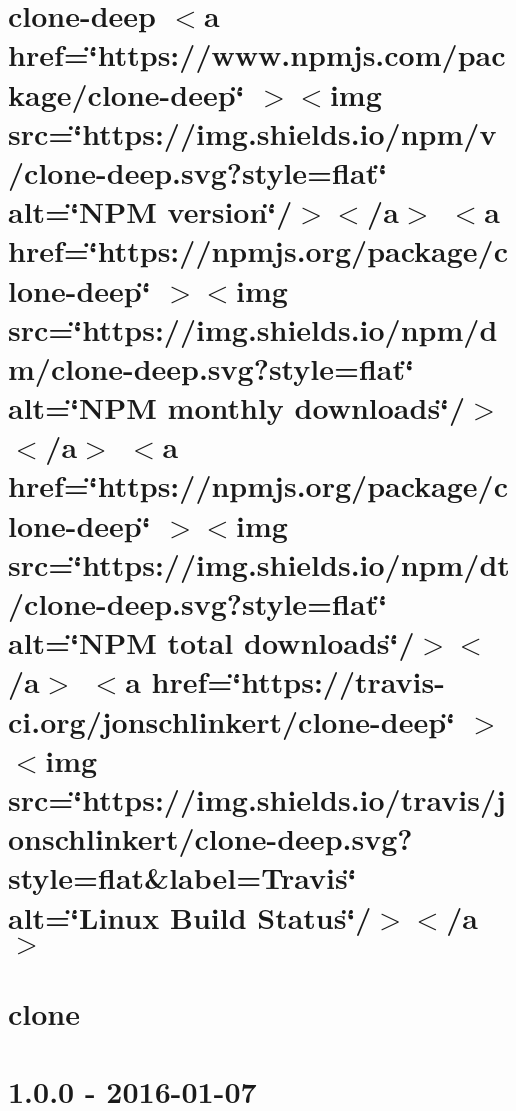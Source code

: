 \documentclass[twoside]{book}
\newcommand{\+}{\discretionary{\mbox{\scriptsize$\hookleftarrow$}}{}{}}
\begin{document}
\chapter{clone-\/deep \texorpdfstring{$<$}{<}a href=\char`\"{}https\+://www.\+npmjs.\+com/package/clone-\/deep\char`\"{} \texorpdfstring{$>$}{>}\texorpdfstring{$<$}{<}img src=\char`\"{}https\+://img.\+shields.\+io/npm/v/clone-\/deep.\+svg?style=flat\char`\"{} alt=\char`\"{}\+NPM version\char`\"{}/\texorpdfstring{$>$}{>}\texorpdfstring{$<$}{<}/a\texorpdfstring{$>$}{>} \texorpdfstring{$<$}{<}a href=\char`\"{}https\+://npmjs.\+org/package/clone-\/deep\char`\"{} \texorpdfstring{$>$}{>}\texorpdfstring{$<$}{<}img src=\char`\"{}https\+://img.\+shields.\+io/npm/dm/clone-\/deep.\+svg?style=flat\char`\"{} alt=\char`\"{}\+NPM monthly downloads\char`\"{}/\texorpdfstring{$>$}{>}\texorpdfstring{$<$}{<}/a\texorpdfstring{$>$}{>} \texorpdfstring{$<$}{<}a href=\char`\"{}https\+://npmjs.\+org/package/clone-\/deep\char`\"{} \texorpdfstring{$>$}{>}\texorpdfstring{$<$}{<}img src=\char`\"{}https\+://img.\+shields.\+io/npm/dt/clone-\/deep.\+svg?style=flat\char`\"{} alt=\char`\"{}\+NPM total downloads\char`\"{}/\texorpdfstring{$>$}{>}\texorpdfstring{$<$}{<}/a\texorpdfstring{$>$}{>} \texorpdfstring{$<$}{<}a href=\char`\"{}https\+://travis-\/ci.\+org/jonschlinkert/clone-\/deep\char`\"{} \texorpdfstring{$>$}{>}\texorpdfstring{$<$}{<}img src=\char`\"{}https\+://img.\+shields.\+io/travis/jonschlinkert/clone-\/deep.\+svg?style=flat\&label=\+Travis\char`\"{} alt=\char`\"{}\+Linux Build Status\char`\"{}/\texorpdfstring{$>$}{>}\texorpdfstring{$<$}{<}/a\texorpdfstring{$>$}{>}}
\label{md__c___users_vaishnavi_jadhav__desktop__developer_code_mean_stack_example_client_node_modules_clone_deep__r_e_a_d_m_e}

\chapter{clone}
\label{md__c___users_vaishnavi_jadhav__desktop__developer_code_mean_stack_example_client_node_modules_clone__r_e_a_d_m_e}

\chapter{1.0.0 -\/ 2016-\/01-\/07}
\label{md__c___users_vaishnavi_jadhav__desktop__developer_code_mean_stack_example_client_node_modules_color_convert__c_h_a_n_g_e_l_o_g}

\end{document}
